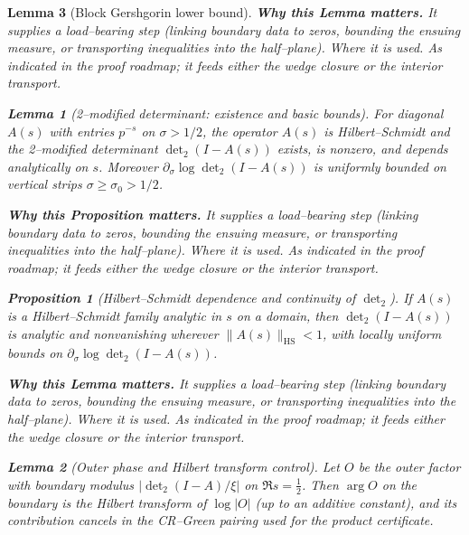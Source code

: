 \documentclass[11pt]{article}
\newtheorem{proposition}{Proposition}[section]
\newtheorem{lemma}{Lemma}[section]
\theoremstyle{definition}
\theoremstyle{remark}
\begin{document}
\begin{lemma}[Block Gershgorin lower bound]
\noindent\textbf{Why this Lemma matters.} It supplies a load--bearing step (linking boundary data to zeros, bounding the ensuing measure, or transporting inequalities into the half--plane).
\noindent\textit{Where it is used.} As indicated in the proof roadmap; it feeds either the wedge closure or the interior transport.
\begin{lemma}[2--modified determinant: existence and basic bounds]\label{lem:det2-unsmoothed}
For diagonal $A(s)$ with entries $p^{-s}$ on $\sigma>1/2$, the operator $A(s)$ is Hilbert--Schmidt and the 2--modified determinant $\det\nolimits_2(I-A(s))$ exists, is nonzero, and depends analytically on $s$. Moreover $\partial_\sigma \log\det\nolimits_2(I-A(s))$ is uniformly bounded on vertical strips $\sigma\ge \sigma_0>1/2$.
\end{lemma}

\noindent\textbf{Why this Proposition matters.} It supplies a load--bearing step (linking boundary data to zeros, bounding the ensuing measure, or transporting inequalities into the half--plane).
\noindent\textit{Where it is used.} As indicated in the proof roadmap; it feeds either the wedge closure or the interior transport.
\begin{proposition}[Hilbert--Schmidt dependence and continuity of $\det_2$]\label{prop:hs-det2-continuity}
If $A(s)$ is a Hilbert--Schmidt family analytic in $s$ on a domain, then $\det\nolimits_2(I-A(s))$ is analytic and nonvanishing wherever $\|A(s)\|_{\mathrm{HS}}<1$, with locally uniform bounds on $\partial_\sigma \log\det\nolimits_2(I-A(s))$.
\end{proposition}

\noindent\textbf{Why this Lemma matters.} It supplies a load--bearing step (linking boundary data to zeros, bounding the ensuing measure, or transporting inequalities into the half--plane).
\noindent\textit{Where it is used.} As indicated in the proof roadmap; it feeds either the wedge closure or the interior transport.
\begin{lemma}[Outer phase and Hilbert transform control]\label{lem:outer-phase-HT}
Let $O$ be the outer factor with boundary modulus $|\det\nolimits_2(I-A)/\xi|$ on $\Re s=\tfrac12$. Then $\arg O$ on the boundary is the Hilbert transform of $\log|O|$ (up to an additive constant), and its contribution cancels in the CR--Green pairing used for the product certificate.
\end{lemma}


\end{lemma}
\end{document}
